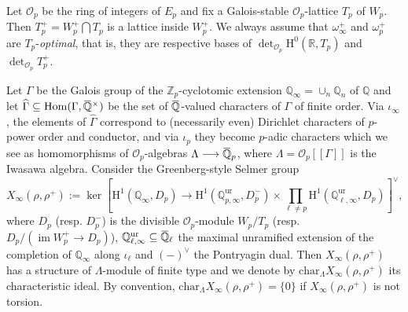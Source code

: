 \documentclass[12pt]{amsart}
\newcommand\bR{\mathbb{R}}
\newcommand\bQ{\mathbb{Q}}
\newcommand\Zp{{\mathbb{Z}_p}}
\newcommand\cO{\mathcal{O}}
\newcommand{\ob}[1]{\mkern 1.5mu\overline{\mkern-1.5mu#1\mkern-1.5mu}\mkern 1.5mu}
\renewcommand{\char}{\textrm{char}}
\DeclareMathOperator{\Hom}{Hom}
\DeclareMathOperator{\im}{im}
\DeclareMathOperator{\Reg}{Reg}
\newcommand{\HH}{\mathrm{H}}
\newcommand{\ff}{\mathrm{f}}
\newcommand{\ur}{\mathrm{ur}}
\theoremstyle{defstyle}
\theoremstyle{thmstyle}
\begin{document}
Let $\cO_p$ be the ring of integers of $E_p$ and fix a Galois-stable $\cO_p$-lattice $T_p$ of $W_p$. Then $T_p^+=W_p^+\bigcap T_p$ is a lattice inside $W_p^+$. We always assume that $\omega_\infty^+$ and $\omega_p^+$ are $T_p$-\textit{optimal}, that is, they are respective bases of $\det_{\cO_p}\HH^0(\bR,T_p)$ and $\det_{\cO_p} T_p^+$. 



Let $\Gamma$ be the Galois group of the $\Zp$-cyclotomic extension $\bQ_\infty=\cup_n \bQ_n$ of $\bQ$ and let $\widehat{\Gamma}\subseteq \Hom(\Gamma,\ob{\bQ}^\times)$ be the set of $\ob{\bQ}$-valued characters of $\Gamma$ of finite order. Via $\iota_\infty$, the elements of $\widehat{\Gamma}$ correspond to (necessarily even) Dirichlet characters of $p$-power order and conductor, and via $\iota_p$ they become $p$-adic characters which we see as homomorphisms of $\cO_p$-algebras $\Lambda \longrightarrow \ob{\bQ}_p$, where $\Lambda=\cO_p[[\Gamma]]$ is the Iwasawa algebra. Consider the Greenberg-style Selmer group \[
X_\infty(\rho,\rho^+):= \ker \left[ \HH^1(\bQ_\infty,D_p) \longrightarrow \HH^1(\bQ_{p,\infty}^\ur,D_p^-) \times \prod_{\ell\neq p} \HH^1(\bQ^\ur_{\ell,\infty},D_p)  \right]^\vee,
\]
where $D_p$ (resp. $D_p^-$) is the divisible $\cO_p$-module $W_p/T_p$ (resp. $D_p/(\im W_p^+ \rightarrow D_p)$), $\bQ^\ur_{\ell,\infty}\subseteq \ob{\bQ}_\ell$ the maximal unramified extension of the completion of $\bQ_\infty$ along $\iota_\ell$ and $(-)^\vee$ the Pontryagin dual. Then $X_\infty(\rho,\rho^+)$ has a structure of $\Lambda$-module of finite type and we denote by $\char_\Lambda X_\infty(\rho,\rho^+)$ its characteristic ideal. By convention, $\char_\Lambda X_\infty(\rho,\rho^+)=\{0\}$ if $X_\infty(\rho,\rho^+)$ is not torsion.
\end{document}

